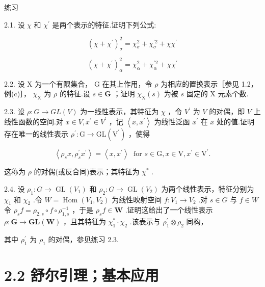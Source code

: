 练习

2.1. 设 \(\chi\) 和 \({\chi }^{\prime }\) 是两个表示的特征.证明下列公式:

\[
{\left( \chi  + {\chi }^{\prime }\right) }_{\sigma }^{2} = {\chi }_{\sigma }^{2} + {\chi }_{\sigma }^{\prime 2} + \chi {\chi }^{\prime }
\]

\[
{\left( \chi  + {\chi }^{\prime }\right) }_{\alpha }^{2} = {\chi }_{\alpha }^{2} + {\chi }_{\alpha }^{\prime 2} + \chi {\chi }^{\prime }
\]

2.2. 设 \(\mathrm{X}\) 为一个有限集合， \(\mathrm{G}\) 在其上作用，令 \(\rho\) 为相应的置换表示［参见 1.2，例(c)］， \({\chi }_{\mathrm{X}}\) 为 \(\rho\) 的特征.设 \(s \in  \mathbf{G}\) ；证明 \({\chi }_{\mathrm{X}}\left( s\right)\) 为被 \(s\) 固定的 \(\mathrm{X}\) 元素个数.

2.3. 设 \(\rho  : G \rightarrow  {GL}\left( V\right)\) 为一线性表示，其特征为 \(\chi\) ，令 \({V}^{\prime }\) 为 \(V\) 的对偶，即 \(V\) 上线性函数的空间.对 \(x \in  V,{x}^{\prime } \in  {V}^{\prime }\) ，记 \(\left\langle  {x,{x}^{\prime }}\right\rangle\) 为线性泛函 \({x}^{\prime }\) 在 \(x\) 处的值.证明存在唯一的线性表示 \({\rho }^{\prime } : \mathrm{G} \rightarrow  \mathrm{{GL}}\left( {\mathrm{V}}^{\prime }\right)\) ，使得

\[
\left\langle  {{\rho }_{s}x,{\rho }_{s}^{\prime }{x}^{\prime }}\right\rangle   = \left\langle  {x,{x}^{\prime }}\right\rangle  \;\text{ for }s \in  \mathrm{G},x \in  \mathrm{V},{x}^{\prime } \in  {\mathrm{V}}^{\prime }.
\]

这称为 \(\rho\) 的对偶(或反合同)表示；其特征为 \({\chi }^{ * }\) .

2.4. 设 \({\rho }_{1} : G \rightarrow  \operatorname{GL}\left( {V}_{1}\right)\) 和 \({\rho }_{2} : G \rightarrow  \operatorname{GL}\left( {V}_{2}\right)\) 为两个线性表示，特征分别为 \({\chi }_{1}\) 和 \({\chi }_{2}\) .令 \(W = \operatorname{Hom}\left( {{V}_{1},{V}_{2}}\right)\) 为线性映射空间 \(f : {V}_{1} \rightarrow  {V}_{2}\) .对 \(s \in  G\) 与 \(f \in  W\) 令 \({\rho }_{s}f = {\rho }_{2,s} \circ  f \circ  {\rho }_{1,s}^{-1}\) ，于是 \({\rho }_{s}f \in  \mathbf{W}\) .证明这给出了一个线性表示 \(\rho  : \mathbf{G} \rightarrow  \mathbf{{GL}}\left( \mathbf{W}\right)\) ，且其特征为 \({\chi }_{1}^{ * } \cdot  {\chi }_{2}\) .该表示与 \({\rho }_{1}^{\prime } \otimes  {\rho }_{2}\) 同构，

其中 \({\rho }_{1}^{\prime }\) 为 \({\rho }_{1}\) 的对偶，参见练习 2.3.

\section*{2.2 舒尔引理；基本应用}


